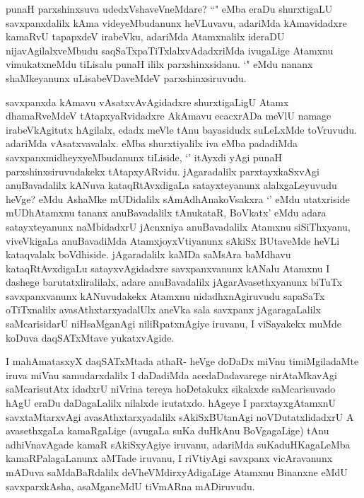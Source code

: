 \begin{artha}
punaH parxshinxsuva udedxVshaveVneMdare? ``\stext " eMba eraDu shurxtigaLU savxpanxdalilx kAma videyeMbudanunx heVLuvavu, adariMda kAmavidadxre kamaRvU tapapxdeV irabeVku, adariMda Atamxnalilx ideraDU nijavAgilalxveMbudu saqSaTxpaTiTxlalxvAdadxriMda ivugaLige Atamxnu vimukatxneMdu tiLisalu punaH ililx parxshinxsidanu. `\stext  " eMdu nananx shaMkeyanunx uLisabeVDaveMdeV parxshinxsiruvudu.
\end{artha}

\begin{artha}
savxpanxda kAmavu vAsatxvAvAgidadxre shurxtigaLigU Atamx dhamaRveMdeV tAtapxyaRvidadxre AkAmavu ecacxrADa meVlU namage irabeVkAgitutx hAgilalx, edadx meVle tAnu bayasidudx suLeLxMde toVruvudu. adariMda vAsatxvavalalx. \stext eMba shurxtiyalilx iva eMba padadiMda savxpanxmidheyxyeMbudanunx tiLiside, `\stext ' itAyxdi yAgi punaH parxshinxsiruvudakekx tAtapxyARvidu. jAgaradalilx parxtayxkaSxvAgi anuBavadalilx kANuva kataqRtAvxdigaLa satayxteyanunx alalxgaLeyuvudu heVge? eMdu AshaMke mUDidalilx sAmAdhAnakoVsakxra `\stext ' eMdu utatxriside mUDhAtamxnu tananx anuBavadalilx tAnukataR, BoVkatx' eMdu adara satayxteyanunx naMbidadxrU jAcnxniya anuBavadalilx Atamxnu siSiThxyanu, viveVkigaLa anuBavadiMda AtamxjoyxVtiyanunx sAkiSx BUtaveMde heVLi kataqvalalx boVdhiside. jAgaradalilx kaMDa saMsAra baMdhavu kataqRtAvxdigaLu satayxvAgidadxre savxpanxvanunx kANalu Atamxnu I dashege barutatxliralilalx, adare anuBavadalilx jAgarAvasethxyanunx biTuTx savxpanxvanunx kANuvudakekx Atamxnu nidadhxnAgiruvudu sapaSaTx oTiTxnalilx avasAthxtarxyadalUlx aneVka sala savxpanx jAgaragaLalilx saMcarisidarU niHsaMganAgi niliRpatxnAgiye iruvanu, I viSayakekx muMde koDuva daqSATxMtave yukatxvAgide. 
\end{artha}%

\begin{artha}
I mahAmatasxyX daqSATxMtada athaR- heVge doDaDx miVnu timiMgiladaMte iruva miVnu samudarxdalilx I daDadiMda acedaDadavarege nirAtaMkavAgi saMcarisutAtx idadxrU niVrina tereya hoDetakukx sikakxde saMcarisuvado hAgU eraDu daDagaLalilx nilalxde irutatxdo. hAgeye I parxtayxgAtamxnU savxtaMtarxvAgi avasAthxtarxyadalilx sAkiSxBUtanAgi noVDutatxlidadxrU A avasethxgaLa kamaRgaLige (avugaLa suKa duHkAnu BoVgagaLige) tAnu adhiVnavAgade kamaR sAkiSxyAgiye iruvanu, adariMda suKaduHKagaLeMba kamaRPalagaLanunx aMTade iruvanu, I riVtiyAgi savxpanx vicAravanunx mADuva saMdaBaRdalilx deVheVMdirxyAdigaLige Atamxnu Binanxne eMdU savxparxkAsha, asaMganeMdU tiVmARna mADiruvudu. 
\end{artha}%

